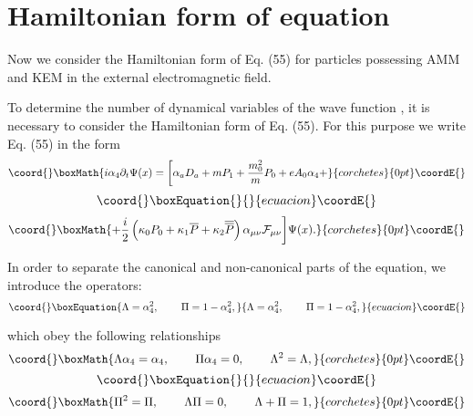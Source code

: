 \documentclass[a4paper,12pt]{article}
\begin{document}
\section{Hamiltonian form of equation}

Now we consider the Hamiltonian form of Eq. (55) for particles
possessing AMM and KEM in the external electromagnetic field.

To determine the number of dynamical variables of the wave
function \coordHE{}, it is necessary to consider the Hamiltonian
form of Eq. (55). For this purpose we write Eq. (55) in the form
\[\coord{}\boxMath{
i\alpha _4\partial _t\Psi (x)=\biggl [\alpha
_aD_a+mP_1+\frac{m_0^2}{m}P_0+eA_0\alpha _4+
}{corchetes}{0pt}\coordE{}\]
\vspace{-8mm}
\begin{equation}\coord{}\boxEquation{
\label{62}
}{
}{ecuacion}\coordE{}\end{equation}
\vspace{-8mm}
\[\coord{}\boxMath{
+\frac i2\left( \kappa _0P_0+\kappa _1\overline{P}+\kappa
_2\overline{ \overline{P}}\right) \alpha _{\mu \nu
}\mathcal{F}_{\mu \nu }\biggr ]\Psi (x).
}{corchetes}{0pt}\coordE{}\]

In order to separate the canonical and non-canonical parts of the
equation, we introduce the operators:
\begin{equation}\coord{}\boxEquation{
\Lambda =\alpha _4^2,\hspace{0.3in}\Pi =1-\alpha _4^2, \label{63}
}{
\Lambda =\alpha _4^2,\hspace{0.3in}\Pi =1-\alpha _4^2, }{ecuacion}\coordE{}\end{equation}

which obey the following relationships
\[\coord{}\boxMath{
\Lambda \alpha _4=\alpha _4,\hspace{0.3in}\Pi \alpha
_4=0,\hspace{0.3in} \Lambda^2=\Lambda,
}{corchetes}{0pt}\coordE{}\]
\vspace{-8mm}
\begin{equation}\coord{}\boxEquation{
\label{64}
}{
}{ecuacion}\coordE{}\end{equation}
\vspace{-8mm}
\[\coord{}\boxMath{
\Pi^2=\Pi,\hspace{0.3in}\Lambda \Pi=0,\hspace{0.3in}\Lambda +\Pi
=1,
}{corchetes}{0pt}\coordE{}\]
\end{document}
